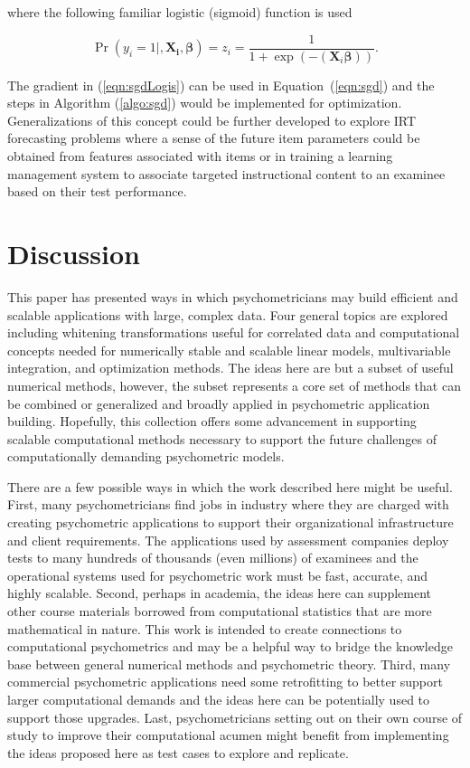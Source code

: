 \documentclass[12pt]{article}
\begin{document}
\noindent where the following familiar logistic (sigmoid) function is used

\begin{equation}
\Pr(y_i=1|,\bm{\bm{X}_i,\beta}) = z_i = \frac{1}{1 + \exp(-(\bm{X}_i\bm{\beta}))}.
\end{equation}

The gradient in (\ref{eqn:sgdLogis}) can be used in Equation~(\ref{eqn:sgd}) and the steps in Algorithm (\ref{algo:sgd}) would be implemented for optimization. Generalizations of this concept could be further developed to explore IRT forecasting problems where a sense of the future item parameters could be obtained from features associated with items or in training a learning management system to associate targeted instructional content to an examinee based on their test performance.   

\section*{Discussion}

This paper has presented ways in which psychometricians may build efficient and scalable applications with large, complex data. Four general topics are explored including whitening transformations useful for correlated data and computational concepts needed for numerically stable and scalable linear models, multivariable integration, and optimization methods. The ideas here are but a subset of useful numerical methods, however, the subset represents a core set of methods that can be combined or generalized and broadly applied in psychometric application building. Hopefully, this collection offers some advancement in supporting scalable computational methods necessary to support the future challenges of computationally demanding psychometric models. 

There are a few possible ways in which the work described here might be useful. First, many psychometricians find jobs in industry where they are charged with creating psychometric applications to support their organizational infrastructure and client requirements. The applications used by assessment companies deploy tests to many hundreds of thousands (even millions) of examinees and the operational systems used for psychometric work must be fast, accurate, and highly scalable. Second, perhaps in academia, the ideas here can supplement other course materials borrowed from computational statistics that are more mathematical in nature. This work is intended to create connections to computational psychometrics and may be a helpful way to bridge the knowledge base between general numerical methods and psychometric theory. Third, many commercial psychometric applications need some retrofitting to better support larger computational demands and the ideas here can be potentially used to support those upgrades. Last, psychometricians setting out on their own course of study to improve their computational acumen might benefit from implementing the ideas proposed here as test cases to explore and replicate.
\end{document}
